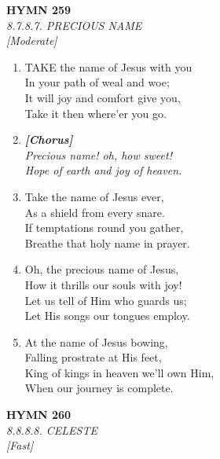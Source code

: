 \documentclass[11pt,a4paper]{article}
\begin{document}
\newpage
\begin{center}
    {\Large \textbf{HYMN 259}}
    \\
    \textit{8.7.8.7. PRECIOUS NAME}
    \\
    \textit{\small [Moderate]}
\end{center}
\vspace{1em}

\begin{enumerate}
    \item TAKE the name of Jesus with you \\
            In your path of weal and woe; \\
        It will joy and comfort give you, \\
            Take it then where'er you go.

    \item[] \vspace{0.4em}
    \textbf{\textit{[Chorus]}} \\
    \textit{Precious name! oh, how sweet!} \\
    \textit{Hope of earth and joy of heaven.}
    \vspace{0.4em}

    \item Take the name of Jesus ever, \\
            As a shield from every snare. \\
        If temptations round you gather, \\
            Breathe that holy name in prayer.

    \item Oh, the precious name of Jesus, \\
            How it thrills our souls with joy! \\
        Let us tell of Him who guards us; \\
            Let His songs our tongues employ.

    \item At the name of Jesus bowing, \\
            Falling prostrate at His feet, \\
        King of kings in heaven we'll own Him, \\
            When our journey is complete.

\end{enumerate}

\newpage
\begin{center}
    {\Large \textbf{HYMN 260}}
    \\
    \textit{8.8.8.8. CELESTE}
    \\
    \textit{\small [Fast]}
\end{center}
\vspace{1em}
\end{document}
